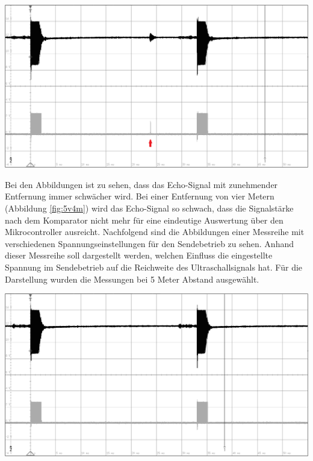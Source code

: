 \begin{minipage}{0.5\textwidth}
\includegraphics[width=1\textwidth%
]{Abbildungen/MessungenP2/5V/4mb.PNG}
\label{fig:5v4m}
\end{minipage}
Bei den Abbildungen ist zu sehen, dass das Echo-Signal mit zunehmender Entfernung immer schwächer wird. Bei einer Entfernung von vier Metern (Abbildung \ref{fig:5v4m}) wird das Echo-Signal so schwach, dass die Signalstärke nach dem Komparator nicht mehr für eine eindeutige Auswertung über den Mikrocontroller ausreicht. Nachfolgend sind die Abbildungen einer Messreihe mit verschiedenen Spannungseinstellungen für den Sendebetrieb zu sehen. Anhand dieser Messreihe soll dargestellt werden, welchen Einfluss die eingestellte Spannung im Sendebetrieb auf die Reichweite des Ultraschallsignals hat. Für die Darstellung wurden die Messungen bei 5 Meter Abstand ausgewählt.\\
\begin{minipage}{0.5\textwidth}
\includegraphics[width=1\textwidth%
]{Abbildungen/MessungenP2/5V/5m.PNG}
\label{fig:5v5m2}
\end{minipage}
